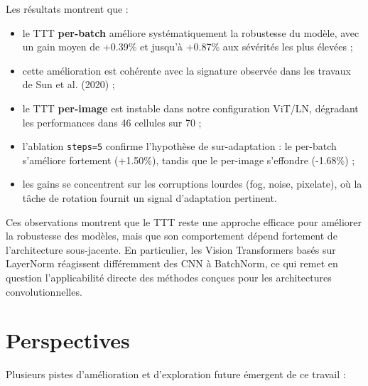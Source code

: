 \documentclass[12pt,a4paper]{report}
\begin{document}
	Les résultats montrent que :
	\begin{itemize}
		\item le TTT \textbf{per-batch} améliore systématiquement la robustesse du modèle, avec un gain moyen de +0.39\% et jusqu’à +0.87\% aux sévérités les plus élevées ;
		\item cette amélioration est cohérente avec la signature observée dans les travaux de Sun et al. (2020) ;
		\item le TTT \textbf{per-image} est instable dans notre configuration ViT/LN, dégradant les performances dans 46 cellules sur 70 ;
		\item l’ablation \texttt{steps=5} confirme l’hypothèse de sur-adaptation : le per-batch s’améliore fortement (+1.50\%), tandis que le per-image s’effondre (-1.68\%) ;
		\item les gains se concentrent sur les corruptions lourdes (fog, noise, pixelate), où la tâche de rotation fournit un signal d’adaptation pertinent.
	\end{itemize}
	
	Ces observations montrent que le TTT reste une approche efficace pour améliorer la robustesse des modèles, mais que son comportement dépend fortement de l’architecture sous-jacente.  
	En particulier, les Vision Transformers basés sur LayerNorm réagissent différemment des CNN à BatchNorm, ce qui remet en question l’applicabilité directe des méthodes conçues pour les architectures convolutionnelles.
	
	\section{Perspectives}
	
	Plusieurs pistes d’amélioration et d’exploration future émergent de ce travail :
	
\end{document}
